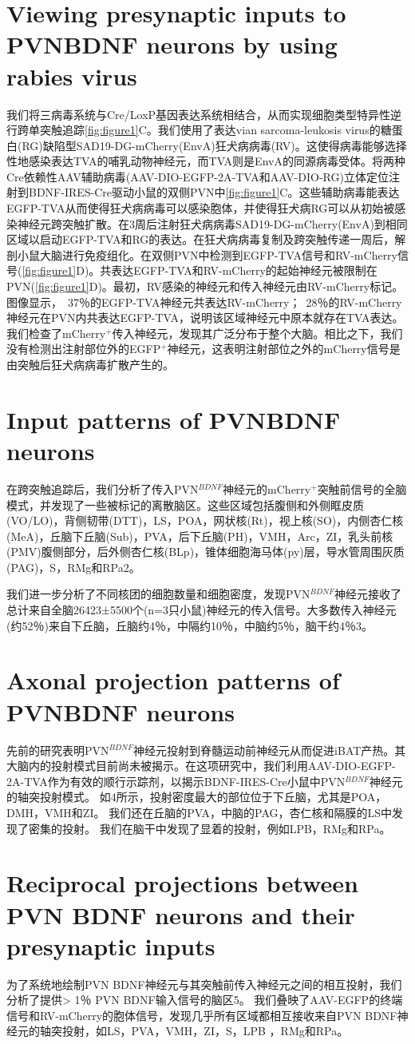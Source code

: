 \section{Viewing presynaptic inputs to PVNBDNF neurons by using rabies virus}
我们将三病毒系统与Cre/LoxP基因表达系统\citep{wickersham2007monosynaptic}相结合，从而实现细胞类型特异性逆行跨单突触追踪\figurename{\ref{fig:figure1}C}。我们使用了表达vian sarcoma-leukosis virus的糖蛋白(RG)缺陷型SAD19-DG-mCherry(EnvA)狂犬病病毒(RV)。这使得病毒能够选择性地感染表达TVA的哺乳动物神经元，而TVA则是EnvA的同源病毒受体。将两种Cre依赖性AAV辅助病毒(AAV-DIO-EGFP-2A-TVA和AAV-DIO-RG)立体定位注射到BDNF-IRES-Cre驱动小鼠的双侧PVN中\figurename{\ref{fig:figure1}C}。这些辅助病毒能表达EGFP-TVA从而使得狂犬病病毒可以感染胞体，并使得狂犬病RG可以从初始被感染神经元跨突触扩散。在3周后注射狂犬病病毒SAD19-DG-mCherry(EnvA)到相同区域以启动EGFP-TVA和RG的表达。在狂犬病病毒复制及跨突触传递一周后，解剖小鼠大脑进行免疫组化。在双侧PVN中检测到EGFP-TVA信号和RV-mCherry信号(\figurename{\ref{fig:figure1}D})。共表达EGFP-TVA和RV-mCherry的起始神经元被限制在PVN(\figurename{\ref{fig:figure1}D})。最初，RV感染的神经元和传入神经元由RV-mCherry标记。图像显示，~37％的EGFP-TVA神经元共表达RV-mCherry；~28％的RV-mCherry神经元在PVN内共表达EGFP-TVA，说明该区域神经元中原本就存在TVA表达。我们检查了mCherry$^{+}$传入神经元，发现其广泛分布于整个大脑。相比之下，我们没有检测出注射部位外的EGFP$^{+}$神经元，这表明注射部位之外的mCherry信号是由突触后狂犬病病毒扩散产生的。

\section{Input patterns of PVNBDNF neurons}
在跨突触追踪后，我们分析了传入PVN$^{BDNF}$神经元的mCherry$^{+}$突触前信号的全脑模式，并发现了一些被标记的离散脑区。这些区域包括腹侧和外侧眶皮质(VO/LO)，背侧韧带(DTT)，LS，POA，网状核(Rt)，视上核(SO)，内侧杏仁核(MeA)，丘脑下丘脑(Sub)，PVA，后下丘脑(PH)，VMH，Arc，ZI，乳头前核(PMV)腹侧部分，后外侧杏仁核(BLp)，锥体细胞海马体(py)层，导水管周围灰质(PAG)，S，RMg和RPa\figurename{2}。

我们进一步分析了不同核团的细胞数量和细胞密度，发现PVN$^{BDNF}$神经元接收了总计来自全脑26423±5500个(n=3只小鼠)神经元的传入信号。大多数传入神经元(约52％)来自下丘脑，丘脑约4％，中隔约10％，中脑约5％，脑干约4％\figurename{3}。

\section{Axonal projection patterns of PVNBDNF neurons}
先前的研究表明PVN$^{BDNF}$神经元投射到脊髓运动前神经元从而促进iBAT产热\citep{an2015discrete}。其大脑内的投射模式目前尚未被揭示。在这项研究中，我们利用AAV-DIO-EGFP-2A-TVA作为有效的顺行示踪剂，以揭示BDNF-IRES-Cre小鼠中PVN$^{BDNF}$神经元的轴突投射模式。 如\figurename{4}所示，投射密度最大的部位位于下丘脑，尤其是POA，DMH，VMH和ZI。 我们还在丘脑的PVA，中脑的PAG，杏仁核和隔膜的LS中发现了密集的投射。 我们在脑干中发现了显着的投射，例如LPB，RMg和RPa。

\section{Reciprocal projections between PVN BDNF neurons and their presynaptic inputs}
为了系统地绘制PVN BDNF神经元与其突触前传入神经元之间的相互投射，我们分析了提供> 1％ PVN BDNF输入信号的脑区\figurename{5}。 我们叠映了AAV-EGFP的终端信号和RV-mCherry的胞体信号，发现几乎所有区域都相互接收来自PVN BDNF神经元的轴突投射，如LS，PVA，VMH，ZI，S，LPB ，RMg和RPa。